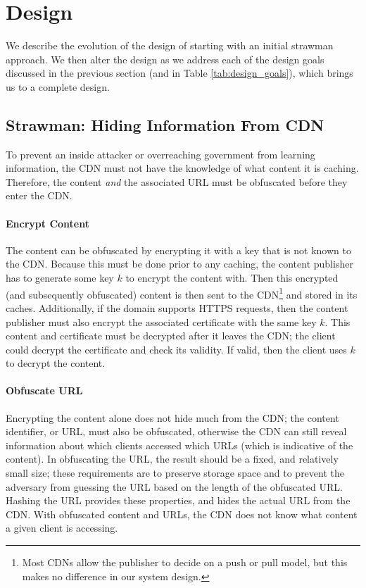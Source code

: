 \section{Design}
\label{sec:design}
We describe the evolution of the design of \system{} starting with an initial strawman approach.  We then 
alter the design as we address each of the design goals discussed in the previous section (and in Table \ref{tab:design_goals}), which brings us 
to a complete design.

\subsection{Strawman: Hiding Information From CDN}
\label{sec:obfuscate_content}
To prevent an inside attacker or overreaching government from learning information, the CDN 
must not have the knowledge of what content it is caching.  Therefore, the content {\it and} the 
associated URL must be obfuscated before they enter the CDN.  

\paragraph{Encrypt Content}  The content can be obfuscated by encrypting it with a key that is not 
known to the CDN.  Because this must be done prior to any caching, the content publisher 
has to generate some key $k$ to encrypt the content with.  Then this encrypted (and subsequently 
obfuscated) content is then sent to the CDN\footnote{Most CDNs
allow the publisher to decide on a push or pull model, but this makes no difference in our 
system design.} and stored in its caches.  
Additionally, if the domain supports HTTPS requests, then the content publisher must also encrypt the 
associated certificate with the same key $k$.  This content and certificate must be decrypted after 
it leaves the CDN; the client could decrypt the certificate and check its validity.  If valid, then 
the client uses $k$ to decrypt the content.  

\paragraph{Obfuscate URL} Encrypting the content alone does not hide much from the CDN; the content 
identifier, or URL, must also be obfuscated, otherwise the CDN can still reveal information about 
which clients accessed which URLs (which is indicative of the content).  In obfuscating the 
URL, the result should be a fixed, and relatively small size; these requirements are to preserve 
storage space and to prevent the adversary from guessing the URL based on the length of the obfuscated 
URL.  Hashing the URL provides these 
properties, and hides the actual URL from the CDN. With obfuscated content and 
URLs, the CDN does not know what content a given client is accessing.

